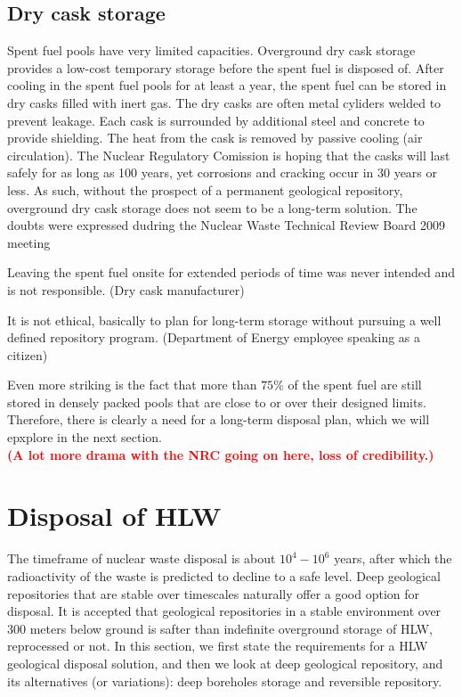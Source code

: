 \documentclass[nofootinbib,preprint,aip,pra]{revtex4-1}
\newcommand{\red}[1]{\textcolor{red}{\bf #1}}
\begin{document}
    \subsection{Dry cask storage}
    Spent fuel pools have very limited capacities. 
    Overground dry cask storage provides a low-cost temporary storage before the spent fuel is disposed of.
    After cooling in the spent fuel pools for at least a year, the spent fuel can be stored in dry casks filled with inert gas. 
    The dry casks are often metal cyliders welded to prevent leakage. Each cask is surrounded by
    additional steel and concrete to provide shielding.
    The heat from the cask is removed by passive
    cooling (air circulation). The Nuclear Regulatory Comission is hoping that the casks will
    last safely for as long as 100 years, yet corrosions and cracking occur in 30 years
    or less.\cite{aa12} As such, without the prospect of a permanent geological repository,
    overground dry cask storage does not seem to be a long-term solution. The doubts were expressed
    dudring  the Nuclear Waste Technical Review Board 2009 meeting \cite{nwtb09, aa12}
    \begin{displayquote}
    Leaving the spent fuel onsite for extended periods of time was never intended and is not
    responsible. (Dry cask manufacturer)

    It is not ethical, basically to plan for long-term storage without pursuing a well defined repository
    program. (Department of Energy employee speaking as a citizen)
    \end{displayquote}
    Even more striking is the fact that more than $75\%$ of the spent fuel are still stored in densely
    packed pools
    that are close to or over their designed limits.\cite{a11,aa12}
    Therefore, there is clearly a need for a long-term disposal plan, which we will epxplore in
    the next section.\\
    \red{(A lot more drama with the NRC going on here, loss of credibility.)}

\section{Disposal of HLW}
\label{sec:disposal}
    The timeframe of nuclear waste disposal is about $10^4-10^6$ years, after which the radioactivity
    of the waste is predicted to decline to a safe level.
    Deep geological repositories that are stable over timescales naturally offer a good option for disposal.
    It is accepted that geological repositories in a stable environment over 300 meters below ground
    is safter than indefinite overground storage of HLW, reprocessed or not.\cite{fmr11}
    In this section, we first state the requirements for a HLW geological disposal solution, and then
    we look at  deep geological repository, and its alternatives (or variations): deep boreholes storage
    and reversible repository.
\end{document}
